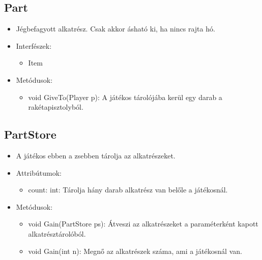 \subsection{Part}
\begin{itemize}
	\item Jégbefagyott alkatrész. Csak akkor ásható ki, ha nincs rajta hó.
	\item Interfészek:
	\begin{itemize}
		\item Item
	\end{itemize}
	\item Metódusok:
	\begin{itemize}
		\item void GiveTo(Player p): A játékos tárolójába kerül egy darab a rakétapisztolyból.
	\end{itemize}
\end{itemize}

\subsection{PartStore}
\begin{itemize}
	\item A játékos ebben a zsebben tárolja az alkatrészeket.
	\item Attribútumok:
	\begin{itemize}
		\item count: int: Tárolja hány darab alkatrész van belőle a játékosnál.
	\end{itemize}
	\item Metódusok:
	\begin{itemize}
		\item void Gain(PartStore ps): Átveszi az alkatrészeket a paraméterként kapott alkatrésztárolóból.
		\item void Gain(int n): Megnő az alkatrészek száma, ami a játékosnál van.
	\end{itemize}
\end{itemize}

